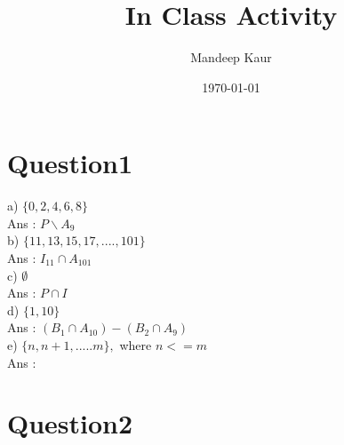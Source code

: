 \documentclass{article}
\title{In Class Activity}
\author{Mandeep Kaur}
\date{\today}
\begin{document}
\maketitle
\section*{Question1}
a)   $ \{0 ,2 ,4,6,8 \}$   					\\ 
Ans :  $P \backslash A_{9}$ 					\\
b)   	$ \{11,13,15,17, .... ,101 \}$ 				\\
Ans :   $ I_{11} \cap A_{101}$					\\
c)  $\emptyset$ 					\\
Ans :   		$ P \cap I$			\\
d)   	$ \{1,10\}$ 				\\
Ans :   	$ (B_{1} \cap A_{10}) - (B_{2} \cap A_{9})$					\\
e)   		$ \{n , n+1 ,..... m \},$  where $n<=m$			\\
Ans :   				\\



\section*{Question2}
\end{document}
